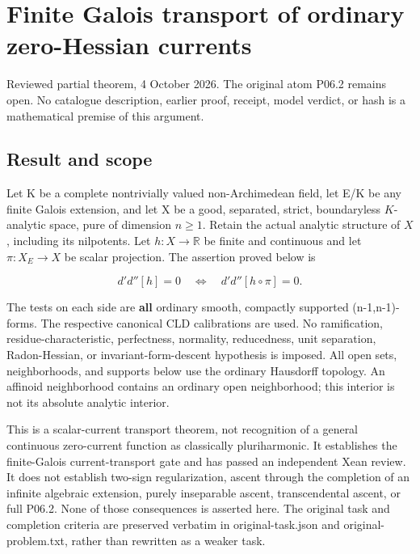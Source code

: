 \documentclass[
  10pt,
]{article}
\author{}
\date{}
\begin{document}
\section{Finite Galois transport of ordinary zero-Hessian
currents}\label{finite-galois-transport-of-ordinary-zero-hessian-currents}

Reviewed partial theorem, 4 October 2026. The original
atom P06.2 remains open. No catalogue description, earlier proof,
receipt, model verdict, or hash is a mathematical premise of this
argument.

\subsection{Result and scope}\label{result-and-scope}

Let K be a complete nontrivially valued non-Archimedean field, let E/K
be any finite Galois extension, and let X be a good, separated, strict,
boundaryless \(K\)-analytic space, pure of dimension \(n\ge 1\).
Retain the actual analytic structure of \(X\), including its nilpotents. Let
\(h:X\to\mathbb{R}\) be finite and continuous and let
\(\pi:X_E\to X\) be scalar projection. The assertion proved below is

\[
 d'd''[h]=0\quad\Longleftrightarrow\quad d'd''[h\circ\pi]=0.       \tag{T}
\]

The tests on each side are \textbf{all} ordinary smooth, compactly
supported (n-1,n-1)-forms. The respective canonical CLD calibrations are
used. No ramification, residue-characteristic, perfectness, normality,
reducedness, unit separation, Radon-Hessian, or invariant-form-descent
hypothesis is imposed. All open sets, neighborhoods, and supports below
use the ordinary Hausdorff topology. An affinoid neighborhood contains
an ordinary open neighborhood; this interior is not its absolute
analytic interior.

This is a scalar-current transport theorem, not recognition of a general
continuous zero-current function as classically pluriharmonic. It
establishes the finite-Galois current-transport gate and has passed
an independent Xean review. It does not establish two-sign regularization,
ascent through the completion of an infinite algebraic extension, purely
inseparable ascent, transcendental ascent, or full P06.2. None of those
consequences is asserted here. The original task and completion criteria
are preserved verbatim in original-task.json and original-problem.txt,
rather than rewritten as a weaker task.
\end{document}

